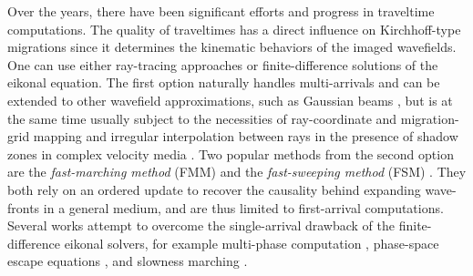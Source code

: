 Over the years, there have been significant efforts and progress in traveltime computations. The 
quality of traveltimes has a direct influence on Kirchhoff-type migrations since it determines the 
kinematic behaviors of the imaged wavefields. One can use either ray-tracing approaches or 
finite-difference solutions of the eikonal equation. The first option naturally handles multi-arrivals 
and can be extended to other wavefield approximations, such as Gaussian beams \cite[]{hill1,hill2,albertin,gray}, 
but is at the same time usually subject to the necessities of ray-coordinate and migration-grid mapping 
and irregular interpolation between rays in the presence of shadow zones in complex velocity media 
\cite[]{sava}. Two popular methods from the second option are the \textit{fast-marching method} (FMM) 
\cite[]{sethian1,sethian2} and the \textit{fast-sweeping method} (FSM) \cite[]{zhao}. They both rely 
on an ordered update to recover the causality behind expanding wave-fronts in a general medium, and 
are thus limited to first-arrival computations. Several works attempt to overcome the single-arrival 
drawback of the finite-difference eikonal solvers, for example multi-phase computation \cite[]{engquist}, 
phase-space escape equations \cite[]{fomel1}, and slowness marching \cite[]{symes}.

